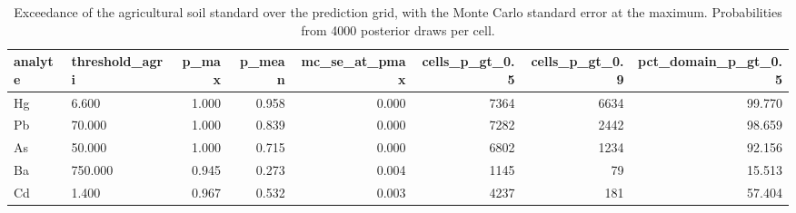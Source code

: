 \begin{table}[htbp]
\centering
\caption{Exceedance of the agricultural soil standard over the prediction grid, with the Monte Carlo standard error at the maximum. Probabilities from 4000 posterior draws per cell.}
\label{tab:exceed}
\footnotesize
\begin{tabular}{llrrrrrr}
\toprule
analyte & threshold\_agri & p\_max & p\_mean & mc\_se\_at\_pmax & cells\_p\_gt\_0.5 & cells\_p\_gt\_0.9 & pct\_domain\_p\_gt\_0.5 \\
\midrule
Hg & 6.600 & 1.000 & 0.958 & 0.000 & 7364 & 6634 & 99.770 \\
Pb & 70.000 & 1.000 & 0.839 & 0.000 & 7282 & 2442 & 98.659 \\
As & 50.000 & 1.000 & 0.715 & 0.000 & 6802 & 1234 & 92.156 \\
Ba & 750.000 & 0.945 & 0.273 & 0.004 & 1145 & 79 & 15.513 \\
Cd & 1.400 & 0.967 & 0.532 & 0.003 & 4237 & 181 & 57.404 \\
\bottomrule
\end{tabular}
\end{table}
